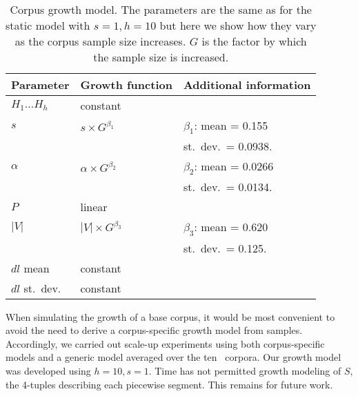 \documentclass{sig-alternate}
\newcommand{\TRECAP}{TREC-AP}
\newcommand{\numcolls}{ten}
\newcommand{\PPS}{../From_Relsci/Experiments_sampling}
\begin{document}
\begin{table}
\begin{tabular}{lll}
Parameter & Growth function & Additional information\\
\hline
$H_1\ldots H_{h}$&constant&\\
$s$&$s \times G^{\beta_1}$&$\beta_1$: mean = 0.155\\
&& st.~dev.~= 0.0938.\\
$\alpha$&$\alpha \times G^{\beta_2}$&$\beta_2$: mean = 0.0266\\
&& st.~dev.~= 0.0134.\\
$P$&linear & \\
$|V|$& $|V| \times G^{\beta_3}$&$\beta_3$: mean = 0.620\\
&& st.~dev.~= 0.125.\\
$\mathit{dl}$ mean & constant & \\
$\mathit{dl}$ st.~dev. & constant & \\
\hline
\end{tabular}
\caption{Corpus growth model. The parameters are the same as
  for the static model with $s=1, h=10$ but here we show how they vary as the corpus sample
  size increases.  $G$ is the factor by which the sample size is increased.
\label{dynmodparams}}
\end{table}


When simulating the growth of a base corpus, it would be most
convenient to avoid the need to derive a corpus-specific growth model
from samples.  Accordingly, we carried out scale-up experiments using
both corpus-specific models and a generic model averaged over the
\numcolls~ corpora.  Our growth model was developed using $h=10, s=1$.
Time has not permitted growth modeling of $S$, the 4-tuples describing
each piecewise segment.  This remains for future work.

\begin{figure*}[!ht]
\centering
   
   
\caption{Showing how bigram attributes of a corpus change with
  growth in corpus size for the \TRECAP~corpus.  Note that subfigure
  (a) is a linear plot while the others are log log.
  \label{scalingup_bigrams_TA}}
\end{figure*}
\end{document}

